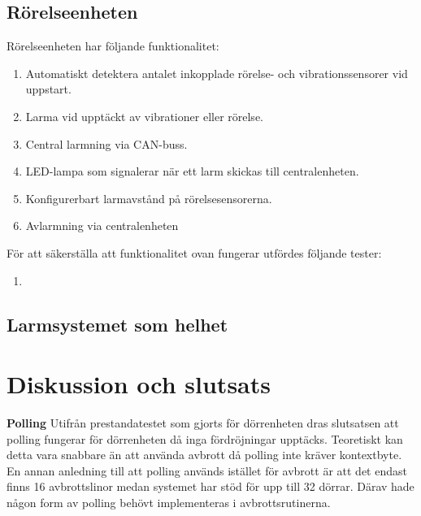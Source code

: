 \documentclass{article}
\begin{document}
 \subsection{Rörelseenheten}
 Rörelseenheten har följande funktionalitet:
 \begin{enumerate}
 	\item Automatiskt detektera antalet inkopplade rörelse- och vibrationssensorer vid uppstart.
	\item Larma vid upptäckt av vibrationer eller rörelse.
    \item Central larmning via CAN-buss.
	\item LED-lampa som signalerar när ett larm skickas till centralenheten.
	\item Konfigurerbart larmavstånd på rörelsesensorerna.
	\item Avlarmning via centralenheten
 \end{enumerate}
 För att säkerställa att funktionalitet ovan fungerar utfördes följande tester:
 \begin{enumerate}
     \item
 \end{enumerate}
 
 \subsection{Larmsystemet som helhet}

\newpage
\section{Diskussion och slutsats}
\textbf{Polling} Utifrån prestandatestet som gjorts för dörrenheten dras slutsatsen att polling fungerar för dörrenheten då inga fördröjningar upptäcks. Teoretiskt kan detta vara snabbare än att använda avbrott då polling inte kräver kontextbyte. En annan anledning till
att polling används istället för avbrott är att det endast finns 16 avbrottslinor medan systemet har stöd för upp till 32 dörrar. Därav hade någon form av polling behövt implementeras i avbrottsrutinerna.




\end{document}
